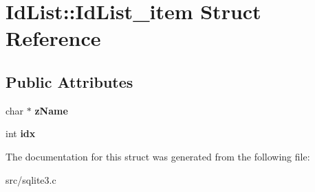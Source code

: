 \hypertarget{struct_id_list_1_1_id_list__item}{\section{Id\-List\-:\-:Id\-List\-\_\-item Struct Reference}
\label{struct_id_list_1_1_id_list__item}
}
\subsection*{Public Attributes}
\begin{DoxyCompactItemize}
\item 
\hypertarget{struct_id_list_1_1_id_list__item_acd44e1182dc46441939cd6a5d935724c}{char $\ast$ {\bfseries z\-Name}}\label{struct_id_list_1_1_id_list__item_acd44e1182dc46441939cd6a5d935724c}

\item 
\hypertarget{struct_id_list_1_1_id_list__item_a869d1a5ee03bcb018e38fae6c9ac0572}{int {\bfseries idx}}\label{struct_id_list_1_1_id_list__item_a869d1a5ee03bcb018e38fae6c9ac0572}

\end{DoxyCompactItemize}


The documentation for this struct was generated from the following file\-:\begin{DoxyCompactItemize}
\item 
src/sqlite3.\-c\end{DoxyCompactItemize}
